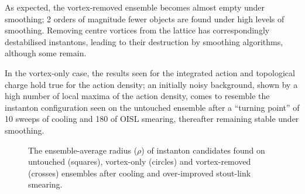 \documentclass[
 reprint,
 amsmath,amssymb,
 aps,
prd,
]{revtex4-1}
\begin{document}
As expected, the vortex-removed ensemble becomes almost empty under smoothing; 2 orders of magnitude fewer objects are found under high levels of smoothing. Removing centre vortices from the lattice has correspondingly destabilised instantons, leading to their destruction by smoothing algorithms, although some remain. \par
In the vortex-only case, the results seen for the integrated action and topological charge hold true for the action density; an initially noisy background, shown by a high number of local maxima of the action density, comes to resemble the instanton configuration seen on the untouched ensemble after a ``turning point'' of 10 sweeps of cooling and 180 of OISL smearing, thereafter remaining stable under smoothing. \par
\begin{figure}[thpb]
\caption{The ensemble-average radius ($\rho$) of instanton candidates found on untouched (squares), vortex-only (circles) and vortex-removed (crosses) ensembles after cooling  and over-improved stout-link smearing. }
\label{Fig:rho}
\end{figure}
\end{document}
